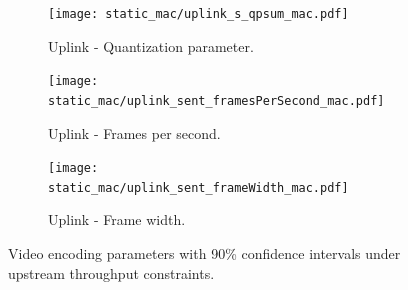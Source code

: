\begin{figure}[t]
        \begin{subfigure}[t]{0.33\textwidth}
    		\centering
        \texttt{[image: static\_mac/uplink\_s\_qpsum\_mac.pdf]}
        \caption{Uplink - Quantization parameter.}
 		\label{subfig:uplink_video_qp_mac}
    \end{subfigure}%
    \hfill
	\begin{subfigure}[t]{0.33\textwidth}
        \centering
        \texttt{[image: static\_mac/uplink\_sent\_framesPerSecond\_mac.pdf]}
    \caption{Uplink - Frames per second.}
    \label{subfig:uplink_frames_per_second_mac}
    \end{subfigure}%
    \hfill
	\begin{subfigure}[t]{0.33\textwidth}   
        \centering
        \texttt{[image: static\_mac/uplink\_sent\_frameWidth\_mac.pdf]}
    \caption{Uplink - Frame width.}
    \label{subfig:uplink_frame_width_mac}
    \end{subfigure}
	\caption{Video encoding parameters with 90\% confidence intervals under upstream throughput constraints.}
    \vspace{-1em}
	\label{fig:video_qual}
\end{figure}

